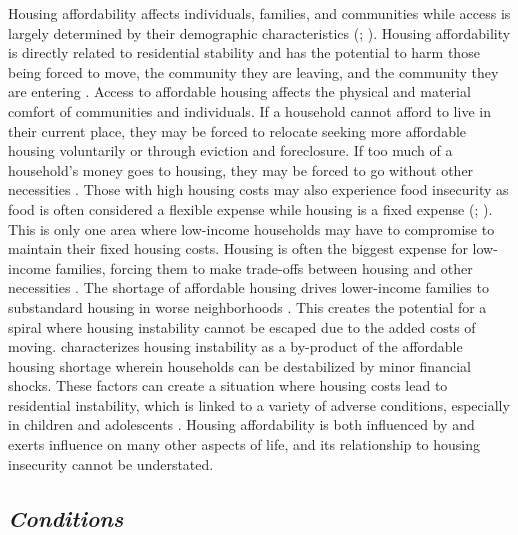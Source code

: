 Housing affordability affects individuals, families, and communities while access is largely determined by their demographic characteristics (\citealp{braveman_housing_2011}; \citealp{yadavalli_comprehensive_2020}). Housing affordability is directly related to residential stability and has the potential to harm those being forced to move, the community they are leaving, and the community they are entering \citep{desmond_forced_2015}. Access to affordable housing affects the physical and material comfort of communities and individuals. If a household cannot afford to live in their current place, they may be forced to relocate seeking more affordable housing voluntarily or through eviction and foreclosure. If too much of a household’s money goes to housing, they may be forced to go without other necessities \citep{herbert_measuring_2018}. Those with high housing costs may also experience food insecurity as food is often considered a flexible expense while housing is a fixed expense (\citealp{fletcher_assessing_2009}; \citealp{kropczynski_insights_2012}). This is only one area where low-income households may have to compromise to maintain their fixed housing costs. Housing is often the biggest expense for low-income families, forcing them to make trade-offs between housing and other necessities \citep{desmond_housing_2015}. The shortage of affordable housing drives lower-income families to substandard housing in worse neighborhoods \citep{braveman_housing_2011}. This creates the potential for a spiral where housing instability cannot be escaped due to the added costs of moving. \citet{kang_severe_2021} characterizes housing instability as a by-product of the affordable housing shortage wherein households can be destabilized by minor financial shocks. These factors can create a situation where housing costs lead to residential instability, which is linked to a variety of adverse conditions, especially in children and adolescents \citep{desmond_forced_2015}. Housing affordability is both influenced by and exerts influence on many other aspects of life, and its relationship to housing insecurity cannot be understated.  

 

\subsection{\textit{Conditions}} 

 

